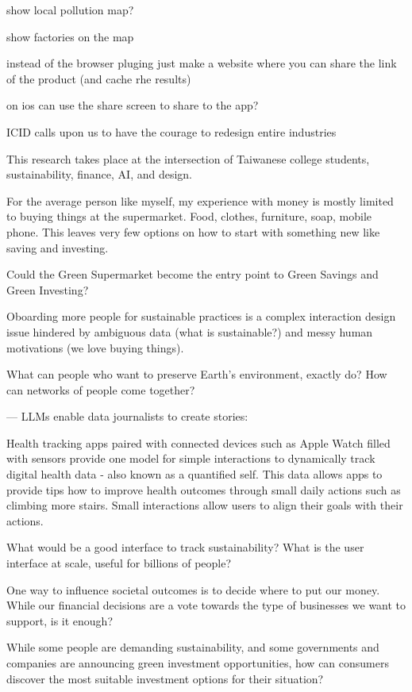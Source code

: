 \documentclass[
  letterpaper,
  DIV=11,
  numbers=noendperiod]{scrartcl}
\begin{document}
show local pollution map?

show factories on the map

instead of the browser pluging just make a website where you can share
the link of the product (and cache rhe results)

on ios can use the share screen to share to the app?

ICID calls upon us to have the courage to redesign entire industries

This research takes place at the intersection of Taiwanese college
students, sustainability, finance, AI, and design.

For the average person like myself, my experience with money is mostly
limited to buying things at the supermarket. Food, clothes, furniture,
soap, mobile phone. This leaves very few options on how to start with
something new like saving and investing.

Could the Green Supermarket become the entry point to Green Savings and
Green Investing?

Oboarding more people for sustainable practices is a complex interaction
design issue hindered by ambiguous data (what is sustainable?) and messy
human motivations (we love buying things).

What can people who want to preserve Earth's environment, exactly do?
How can networks of people come together?

--- LLMs enable data journalists to create stories:
\citet{biglocalnewsExpertShareSimon2024}

Health tracking apps paired with connected devices such as Apple Watch
filled with sensors provide one model for simple interactions to
dynamically track digital health data - also known as a quantified self.
This data allows apps to provide tips how to improve health outcomes
through small daily actions such as climbing more stairs. Small
interactions allow users to align their goals with their actions.

What would be a good interface to track sustainability? What is the user
interface at scale, useful for billions of people?

One way to influence societal outcomes is to decide where to put our
money. While our financial decisions are a vote towards the type of
businesses we want to support, is it enough?

While some people are demanding sustainability, and some governments and
companies are announcing green investment opportunities, how can
consumers discover the most suitable investment options for their
situation?
\end{document}
